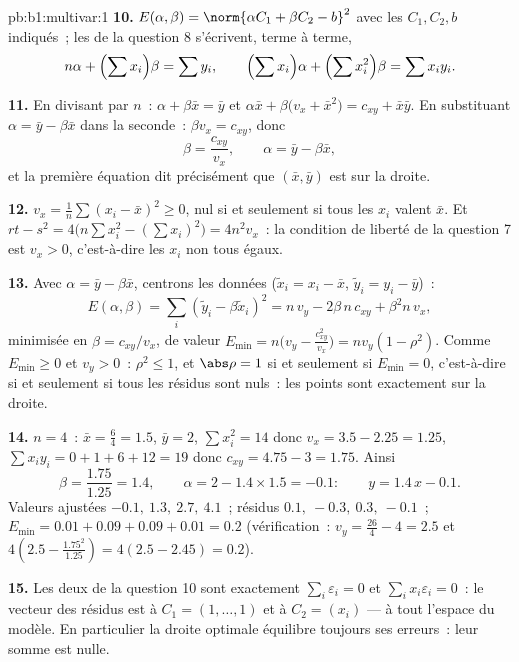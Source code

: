 \begin{solution}{pb:b1:multivar:1}
\textbf{10.} $E(\alpha, \beta) = \norm{\alpha C_1 + \beta C_2 -
b}^2$ avec les $C_1, C_2, b$ indiqués~; les  de
la question 8 s'écrivent, terme à terme,
\[
n\alpha + \Bigl(\sum x_i\Bigr)\beta = \sum y_i,
\qquad
\Bigl(\sum x_i\Bigr)\alpha + \Bigl(\sum x_i^2\Bigr)\beta = \sum
x_i y_i .
\]

\textbf{11.} En divisant par $n$~: $\alpha + \beta\bar x = \bar y$
et $\alpha\bar x + \beta\bigl(v_x + \bar x^2\bigr) = c_{xy} +
\bar x\bar y$. En substituant $\alpha = \bar y - \beta\bar x$ dans
la seconde~: $\beta v_x = c_{xy}$, donc
\[
\beta = \frac{c_{xy}}{v_x}, \qquad \alpha = \bar y - \beta\bar
x ,
\]
et la première équation dit précisément que $(\bar x, \bar y)$
est sur la droite.

\textbf{12.} $v_x = \frac1n\sum(x_i - \bar x)^2 \geq 0$, nul si et
seulement si tous les $x_i$ valent $\bar x$. Et $rt - s^2 =
4\bigl(n\sum x_i^2 - (\sum x_i)^2\bigr) = 4n^2 v_x$~: la condition
de liberté de la question 7 est $v_x > 0$, c'est-à-dire les $x_i$
non tous égaux.

\textbf{13.} Avec $\alpha = \bar y - \beta\bar x$, centrons les
données ($\tilde x_i = x_i - \bar x$, $\tilde y_i = y_i - \bar
y$)~:
\[
E(\alpha, \beta) = \sum_i(\tilde y_i - \beta\tilde x_i)^2
= n\,v_y - 2\beta\,n\,c_{xy} + \beta^2 n\,v_x ,
\]
minimisée en $\beta = c_{xy}/v_x$, de valeur $E_{\min} =
n\bigl(v_y - \frac{c_{xy}^2}{v_x}\bigr) = n v_y(1 - \rho^2)$.
Comme $E_{\min} \geq 0$ et $v_y > 0$~: $\rho^2 \leq 1$, et
$\abs\rho = 1$ si et seulement si $E_{\min} = 0$, c'est-à-dire si
et seulement si tous les résidus sont nuls~: les points sont
exactement sur la droite.

\textbf{14.} $n = 4$~: $\bar x = \frac64 = 1.5$, $\bar y = 2$,
$\sum x_i^2 = 14$ donc $v_x = 3.5 - 2.25 = 1.25$, $\sum x_iy_i =
0 + 1 + 6 + 12 = 19$ donc $c_{xy} = 4.75 - 3 = 1.75$. Ainsi
\[
\beta = \frac{1.75}{1.25} = 1.4,
\qquad
\alpha = 2 - 1.4\times1.5 = -0.1 :
\qquad y = 1.4\,x - 0.1 .
\]
Valeurs ajustées $-0.1,\ 1.3,\ 2.7,\ 4.1$~; résidus $0.1,\ -0.3,\
0.3,\ -0.1$~; $E_{\min} = 0.01 + 0.09 + 0.09 + 0.01 = 0.2$
(vérification~: $v_y = \frac{26}4 - 4 = 2.5$ et $4(2.5 -
\frac{1.75^2}{1.25}) = 4(2.5 - 2.45) = 0.2$).

\textbf{15.} Les deux  de la question 10 sont
exactement $\sum_i\varepsilon_i = 0$ et $\sum_i x_i\varepsilon_i =
0$~: le vecteur des résidus est  à $C_1 = (1, \dots, 1)$
et à $C_2 = (x_i)$ --- à tout l'espace du modèle. En particulier
la droite optimale équilibre toujours ses erreurs~: leur somme est
nulle.


\end{solution}
